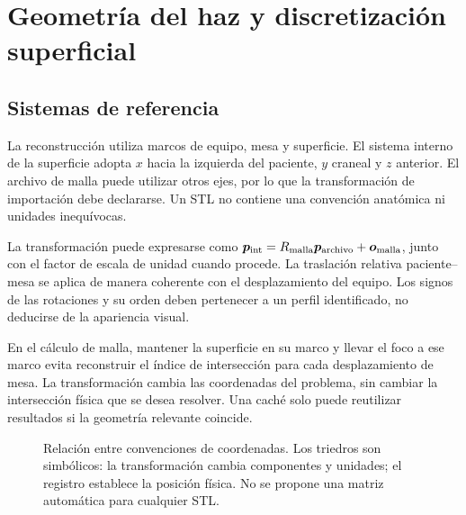 \chapter{Geometría del haz y discretización superficial}
\section{Sistemas de referencia}
La reconstrucción utiliza marcos de equipo, mesa y superficie. El sistema interno de la superficie adopta $x$ hacia la izquierda del paciente, $y$ craneal y $z$ anterior. El archivo de malla puede utilizar otros ejes, por lo que la transformación de importación debe declararse. Un STL no contiene una convención anatómica ni unidades inequívocas.

La transformación puede expresarse como $\bm{p}_{\mathrm{int}}=R_{\mathrm{malla}}\bm{p}_{\mathrm{archivo}}+\bm{o}_{\mathrm{malla}}$, junto con el factor de escala de unidad cuando procede. La traslación relativa paciente--mesa se aplica de manera coherente con el desplazamiento del equipo. Los signos de las rotaciones y su orden deben pertenecer a un perfil identificado, no deducirse de la apariencia visual.

En el cálculo de malla, mantener la superficie en su marco y llevar el foco a ese marco evita reconstruir el índice de intersección para cada desplazamiento de mesa. La transformación cambia las coordenadas del problema, sin cambiar la intersección física que se desea resolver. Una caché solo puede reutilizar resultados si la geometría relevante coincide.



\begin{figure}[htbp]\centering
\caption{Relación entre convenciones de coordenadas. Los triedros son simbólicos: la transformación cambia componentes y unidades; el registro establece la posición física. No se propone una matriz automática para cualquier STL.}\label{fig:coordenadas}\end{figure}


